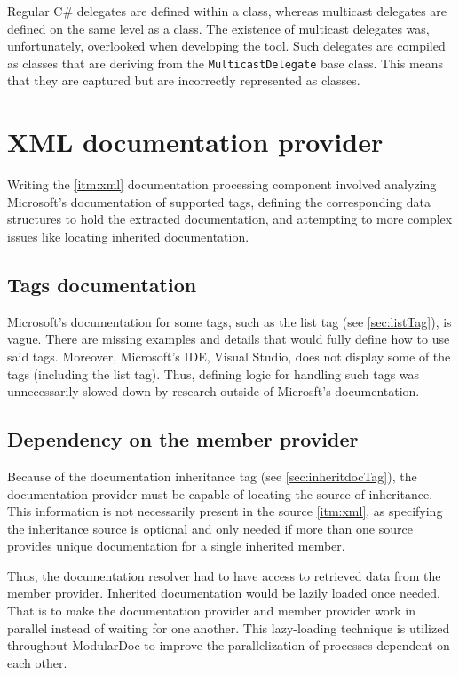 Regular C\# delegates are defined within a class, whereas multicast delegates are defined on the same level as a class.
The existence of multicast delegates was, unfortunately, overlooked when developing the tool.
Such delegates are compiled as classes that are deriving from the \lstinline[language=csh]{MulticastDelegate} base class.
This means that they are captured but are incorrectly represented as classes.

\section{XML documentation provider}

Writing the \ref{itm:xml} documentation processing component involved analyzing Microsoft's documentation of supported tags, defining the corresponding data structures to hold the extracted documentation, and attempting to more complex issues like locating inherited documentation.

\subsection{Tags documentation}

Microsoft's documentation for some tags, such as the list tag (see \ref{sec:listTag}), is vague. There are missing examples and details that would fully define how to use said tags. Moreover, Microsoft's IDE, Visual Studio, does not display some of the tags (including the list tag). Thus, defining logic for handling such tags was unnecessarily slowed down by research outside of Microsft's documentation.

\subsection{Dependency on the member provider}

Because of the documentation inheritance tag (see \ref{sec:inheritdocTag}), the documentation provider must be capable of locating the source of inheritance. This information is not necessarily present in the source \ref{itm:xml}, as specifying the inheritance source is optional and only needed if more than one source provides unique documentation for a single inherited member.

Thus, the documentation resolver had to have access to retrieved data from the member provider. Inherited documentation would be lazily loaded once needed. That is to make the documentation provider and member provider work in parallel instead of waiting for one another. This lazy-loading technique is utilized throughout ModularDoc to improve the parallelization of processes dependent on each other.

